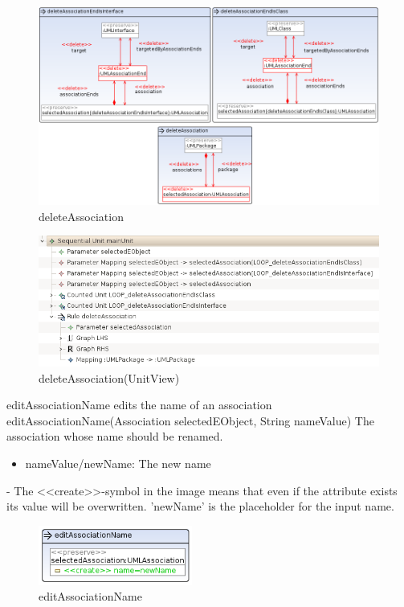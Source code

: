 \begin{figure}[H]
  \advance\leftskip-1.5cm
  \includegraphics[width=1.2\textwidth]{pics/deleteAssociation.png}
  \caption{deleteAssociation}
  \label{deleteAssociation}
\end{figure}
\begin{figure}[H]
  \advance\leftskip-1.5cm
  \includegraphics[width=1.2\textwidth]{pics/deleteAssociation_TreeView.png}
  \caption{deleteAssociation(UnitView)}
  \label{deleteAssociation(UnitView)}
\end{figure}
\op
{editAssociationName}
{edits the name of an association}
{editAssociationName(Association selectedEObject, String nameValue)}
{The association whose name should be renamed.}
{
\begin{itemize}
 \item nameValue/newName: The new name
\end{itemize}
}
{-}
{The \textless\textless create\textgreater\textgreater  -symbol in the image
means that even if the attribute exists its value will be overwritten.
'newName' is the placeholder for the input name.}
\begin{figure}[H]
  \centering
  \includegraphics[width=0.45\textwidth]{pics/editAssociationName.png}
  \caption{editAssociationName}
  \label{editAssociationName}
\end{figure}